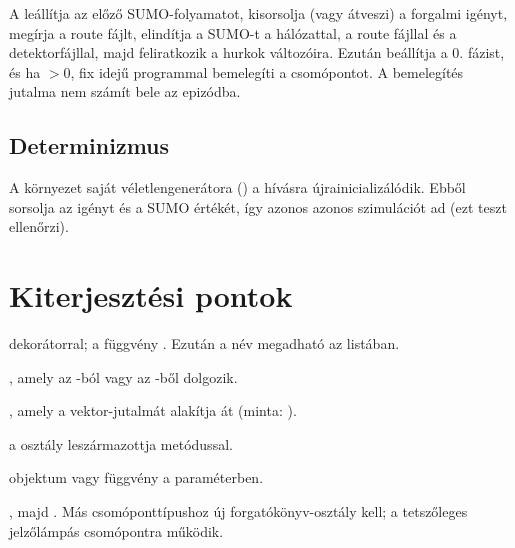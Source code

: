 \documentclass[11pt,a4paper]{article}
\begin{document}
A  leállítja az előző SUMO-folyamatot, kisorsolja (vagy átveszi) a forgalmi igényt,
megírja a route fájlt, elindítja a SUMO-t a hálózattal, a route fájllal és a detektorfájllal, majd
feliratkozik a hurkok változóira. Ezután beállítja a 0. fázist, és ha  $>0$, fix idejű
programmal bemelegíti a csomópontot. A bemelegítés jutalma nem számít bele az epizódba.

\subsection{Determinizmus}

A környezet saját véletlengenerátora () a 
hívásra újrainicializálódik. Ebből sorsolja az igényt és a SUMO  értékét, így azonos
 azonos szimulációt ad (ezt teszt ellenőrzi).

\section{Kiterjesztési pontok}

\begin{description}[style=nextline,leftmargin=1.5em]
  \item[Új célfüggvény]  dekorátorral; a függvény
    . Ezután a név megadható az  listában.
  \item[Új megfigyelés] , amely az -ból vagy az
    -ből dolgozik.
  \item[Új skalarizálás] , amely a  vektor-jutalmát alakítja át (minta:
    ).
  \item[Új vezérlő] a  osztály leszármazottja  metódussal.
  \item[Más forgalom]  objektum vagy  függvény a 
    paraméterben.
  \item[Más geometria] , majd
    . Más csomóponttípushoz új forgatókönyv-osztály kell; a
     tetszőleges jelzőlámpás csomópontra működik.
\end{description}

\end{document}
